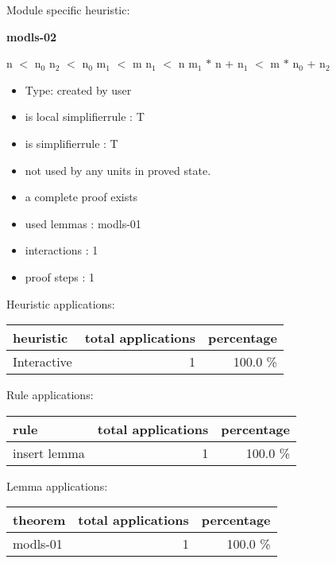 \documentclass[a4paper]{article}
\begin{document}
Module specific heuristic:

\pagebreak

{\LARGE\bf modls-02}\label{lemma-modls-02}

\medskip

 \Fol n $<$ $\mbox{n}_{0}$ \And $\mbox{n}_{2}$ $<$ $\mbox{n}_{0}$ \And $\mbox{m}_{1}$ $<$ m \And $\mbox{n}_{1}$ $<$ n \Imp $\mbox{m}_{1}$ $*$ n + $\mbox{n}_{1}$ $<$ m $*$ $\mbox{n}_{0}$ + $\mbox{n}_{2}$

\begin{itemize}

\item Type: created by user

\item is local simplifierrule : T
\item is simplifierrule : T
\item not used by any units in proved state.
\item       a complete proof exists
\item       used lemmas  : modls-01
\item       interactions : 1
\item       proof steps  : 1
\end{itemize}

\medskip


Heuristic applications:

\begin{supertabular}{l|r|r}
heuristic	& total applications & percentage \\ \hline
Interactive & 1 & 100.0 \% \\

\end{supertabular}

Rule applications:

\begin{supertabular}{l|r|r}
rule	        & total applications & percentage \\ \hline
insert lemma & 1 & 100.0 \% \\

\end{supertabular}

Lemma applications:

\begin{supertabular}{l|r|r}
theorem	        & total applications & percentage \\ \hline
modls-01 & 1 & 100.0 \% \\

\end{supertabular}
\end{document}
